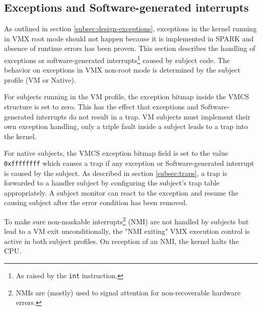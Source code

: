 \subsection{Exceptions and Software-generated interrupts}
As outlined in section \ref{subsec:design-exceptions}, exceptions in the kernel
running in VMX root mode should not happen because it is implemented in SPARK
and absence of runtime errors has been proven.  This section describes the
handling of exceptions or software-generated interrupts\footnote{As raised by
the \texttt{int} instruction.} caused by subject code. The behavior on
exceptions in VMX non-root mode is determined by the subject profile (VM or
Native).

For subjects running in the VM profile, the exception bitmap inside the VMCS
structure is set to zero. This has the effect that exceptions and
Software-generated interrupts do not result in a trap. VM subjects must
implement their own exception handling, only a triple fault inside a subject
leads to a trap into the kernel.

For native subjects, the VMCS exception bitmap field is set to the value
\texttt{0xffffffff} which causes a trap if any exception or Software-generated
interrupt is caused by the subject. As described in section \ref{subsec:traps},
a trap is forwarded to a handler subject by configuring the subject's trap
table appropriately. A subject monitor can react to the exception and resume
the causing subject after the error condition has been removed.

To make sure non-maskable interrupts\footnote{NMIs are (mostly) used to signal
attention for non-recoverable hardware errors.} (NMI) are not
handled by subjects but lead to a VM exit unconditionally, the "NMI exiting"
VMX execution control is active in both subject profiles. On reception of an
NMI, the kernel halts the CPU.
